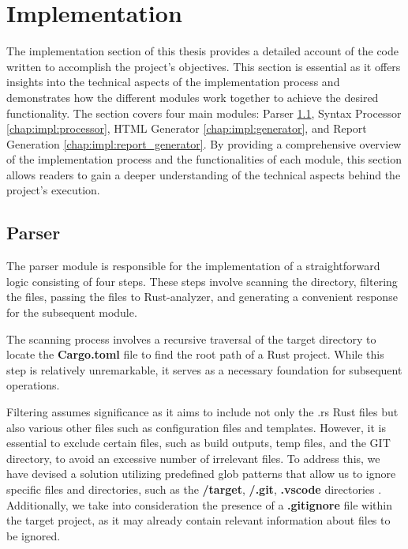 \chapter{Implementation}
\label{chap:impl}

The implementation section of this thesis provides a detailed account of the code written to accomplish the project's objectives. This section is essential as it offers insights into the technical aspects of the implementation process and demonstrates how the different modules work together to achieve the desired functionality. The section covers four main modules: Parser \ref{chap:impl:parser}, Syntax Processor \ref{chap:impl:processor}, HTML Generator \ref{chap:impl:generator}, and Report Generation \ref{chap:impl:report_generator}. By providing a comprehensive overview of the implementation process and the functionalities of each module, this section allows readers to gain a deeper understanding of the technical aspects behind the project's execution.


\section{Parser}
\label{chap:impl:parser}
The parser module is responsible for the implementation of a straightforward logic consisting of four steps. These steps involve scanning the directory, filtering the files, passing the files to Rust-analyzer, and generating a convenient response for the subsequent module.

The scanning process involves a recursive traversal of the target directory to locate the \textbf{Cargo.toml} file to find the root path of a Rust project. While this step is relatively unremarkable, it serves as a necessary foundation for subsequent operations.

Filtering assumes significance as it aims to include not only the .rs Rust files but also various other files such as configuration files and templates. However, it is essential to exclude certain files, such as build outputs, temp files, and the GIT directory, to avoid an excessive number of irrelevant files. To address this, we have devised a solution utilizing predefined glob patterns that allow us to ignore specific files and directories, such as the \textbf{/target}, \textbf{/.git}, \textbf{.vscode} directories . Additionally, we take into consideration the presence of a \textbf{.gitignore} file within the target project, as it may already contain relevant information about files to be ignored.

